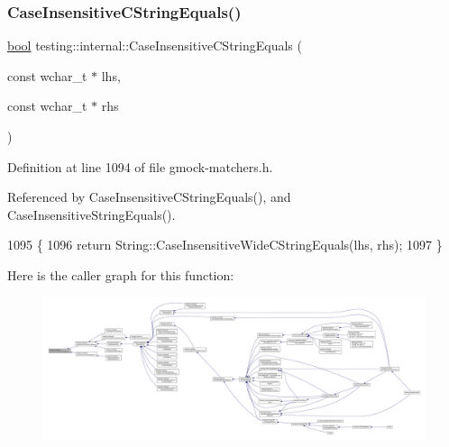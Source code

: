 \subsubsection{\texorpdfstring{Case\+Insensitive\+C\+String\+Equals()}{CaseInsensitiveCStringEquals()}\hspace{0.1cm}{\footnotesize\ttfamily [2/2]}}
{\footnotesize\ttfamily \hyperlink{classbool}{bool} testing\+::internal\+::\+Case\+Insensitive\+C\+String\+Equals (\begin{DoxyParamCaption}\item[{const wchar\+\_\+t $\ast$}]{lhs,  }\item[{const wchar\+\_\+t $\ast$}]{rhs }\end{DoxyParamCaption})\hspace{0.3cm}{\ttfamily [inline]}}



Definition at line 1094 of file gmock-\/matchers.\+h.



Referenced by Case\+Insensitive\+C\+String\+Equals(), and Case\+Insensitive\+String\+Equals().


\begin{DoxyCode}
1095                                                              \{
1096   \textcolor{keywordflow}{return} String::CaseInsensitiveWideCStringEquals(lhs, rhs);
1097 \}
\end{DoxyCode}
Here is the caller graph for this function\+:
\nopagebreak
\begin{figure}[H]
\begin{center}
\leavevmode
\includegraphics[width=350pt]{namespacetesting_1_1internal_ad5b31f61a3cc5b4226d3560f5b48f4dd_icgraph}
\end{center}
\end{figure}
\mbox{\label{namespacetesting_1_1internal_a383de24b1cca6648c14b03964c0ed843}} 
